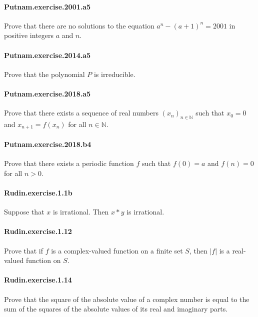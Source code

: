 \documentclass{article}
\begin{document}
\paragraph{Putnam.exercise.2001.a5} Prove that there are no solutions to the equation $a^n - (a+1)^n = 2001$ in positive integers $a$ and $n$.

\paragraph{Putnam.exercise.2014.a5} Prove that the polynomial $P$ is irreducible.

\paragraph{Putnam.exercise.2018.a5} Prove that there exists a sequence of real numbers $(x_n)_{n\in\mathbb{N}}$ such that $x_0 = 0$ and $x_{n+1} = f(x_n)$ for all $n\in\mathbb{N}$.

\paragraph{Putnam.exercise.2018.b4} Prove that there exists a periodic function $f$ such that $f(0) = a$ and $f(n) = 0$ for all $n > 0$.

\paragraph{Rudin.exercise.1.1b} Suppose that $x$ is irrational. Then $x * y$ is irrational.



\paragraph{Rudin.exercise.1.12} Prove that if $f$ is a complex-valued function on a finite set $S$, then $|f|$ is a real-valued function on $S$.

\paragraph{Rudin.exercise.1.14} Prove that the square of the absolute value of a complex number is equal to the sum of the squares of the absolute values of its real and imaginary parts.
\end{document}
